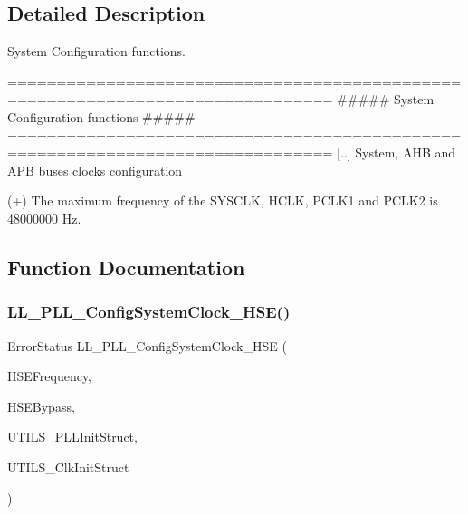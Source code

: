 \subsection{Detailed Description}
System Configuration functions. 

\begin{DoxyVerb}===============================================================================
          ##### System Configuration functions #####
===============================================================================
   [..]
        System, AHB and APB buses clocks configuration

        (+) The maximum frequency of the SYSCLK, HCLK, PCLK1 and PCLK2 is 48000000 Hz.\end{DoxyVerb}


\subsection{Function Documentation}
\mbox{\label{group___u_t_i_l_s___e_f___s_y_s_t_e_m_gaf6c8553d03464d4646b63321b97d25e2}} 
\subsubsection{\texorpdfstring{L\+L\+\_\+\+P\+L\+L\+\_\+\+Config\+System\+Clock\+\_\+\+H\+S\+E()}{LL\_PLL\_ConfigSystemClock\_HSE()}}
{\footnotesize\ttfamily Error\+Status L\+L\+\_\+\+P\+L\+L\+\_\+\+Config\+System\+Clock\+\_\+\+H\+SE (\begin{DoxyParamCaption}\item[{uint32\+\_\+t}]{H\+S\+E\+Frequency,  }\item[{uint32\+\_\+t}]{H\+S\+E\+Bypass,  }\item[{\hyperlink{struct_l_l___u_t_i_l_s___p_l_l_init_type_def}{L\+L\+\_\+\+U\+T\+I\+L\+S\+\_\+\+P\+L\+L\+Init\+Type\+Def} $\ast$}]{U\+T\+I\+L\+S\+\_\+\+P\+L\+L\+Init\+Struct,  }\item[{\hyperlink{struct_l_l___u_t_i_l_s___clk_init_type_def}{L\+L\+\_\+\+U\+T\+I\+L\+S\+\_\+\+Clk\+Init\+Type\+Def} $\ast$}]{U\+T\+I\+L\+S\+\_\+\+Clk\+Init\+Struct }\end{DoxyParamCaption})}



